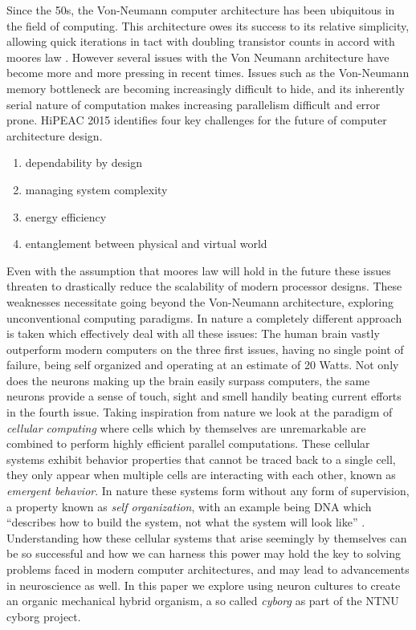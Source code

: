 Since the 50s, the Von-Neumann computer architecture has been ubiquitous in the
field of computing. This architecture owes its success to its relative
simplicity, allowing quick iterations in tact with doubling transistor counts in
accord with moores law \cite{moore}.
However several issues with the Von Neumann architecture have become more and more
pressing in recent times.
Issues such as the Von-Neumann memory bottleneck are becoming increasingly
difficult to hide, and its inherently serial nature of computation makes
increasing parallelism difficult and error prone.
HiPEAC 2015\cite{HIPEAC} identifies four key challenges for the future of
computer architecture design.
\begin{enumerate}
\item dependability by design
\item managing system complexity
\item energy efficiency
\item entanglement between physical and virtual world
\end{enumerate}
Even with the assumption that moores law will hold in the future these issues
threaten to drastically reduce the scalability of modern processor designs.
These weaknesses necessitate going beyond the Von-Neumann architecture,
exploring unconventional computing paradigms.
In nature a completely different approach is taken which effectively deal with
all these issues:
The human brain vastly outperform modern computers on the three first issues, having no
single point of failure, being self organized and operating at an estimate of 20 Watts.
Not only does the neurons making up the brain easily surpass computers, the same
neurons provide a sense of touch, sight and smell handily beating current
efforts in the fourth issue.
Taking inspiration from nature we look at the paradigm of \textit{cellular computing}
\cite{sipper_emergence_1999} where cells which by themselves are unremarkable
are combined to perform highly efficient parallel computations.
These cellular systems exhibit behavior properties that cannot be
traced back to a single cell, they only appear when multiple cells are
interacting with each other, known as \textit{emergent behavior}.
In nature these systems form without any form of supervision, a property known
as \textit{self organization}, with an example being
DNA which ``describes how to build the system, not what the system will look
like'' \cite{tufte_evo_2009}.
Understanding how these cellular systems that arise seemingly by
themselves can be so successful and how we can harness this power may hold the
key to solving problems faced in modern computer architectures, and may lead to
advancements in neuroscience as well.
In this paper we explore using neuron cultures to create an organic mechanical
hybrid organism, a so called \textit{cyborg} as part of the NTNU cyborg project.
